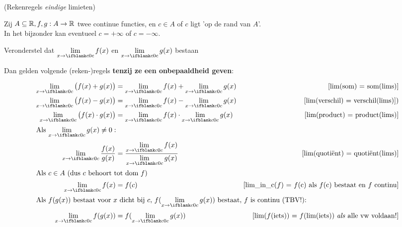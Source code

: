 \documentclass[numbers]{ximera}
\begin{document}
\begin{proposition} (Rekenregels \textit{eindige} limieten)
	
	Zij $A\subseteq\mathbb{R}, f,g:A\to\mathbb{R}$ twee continue functies, en $c\in A$ of $c$ ligt 'op de rand van $A$'. \\
	In het bijzonder kan eventueel $c=+\infty$ of $c=-\infty$. 
	
	Veronderstel dat $\limx[c] f(x)$ en $\limx[c] g(x)$ bestaan%
	
	Dan gelden volgende (reken-)regels  \textbf{\color{red} tenzij ze een {\large onbepaaldheid} geven}: 
	
	
	\begin{align}
		 \limx[c] \big(f(x) +g(x)\big) & = \limx[c] f(x) + \limx[c] g(x)  
		     & \text{[lim(som) = som(lims)]} \label{elim-som} \\
		 \limx[c] \big(f(x) -g(x)\big) & = \limx[c] f(x) - \limx[c] g(x)  
		     & \text{[lim(verschil) = verschil(lims)])} \label{elim-verschil}\\
		 \limx[c] \big(f(x)\cdot g(x)\big) & = \limx[c] f(x) \cdot \limx[c] g(x)  
		     & \text{[lim(product) =  product(lims)]} \label{elim-product} \\
		 \intertext{Als $\limx[c] g(x) \neq 0:$}
		 \limx[c] \dfrac{f(x)}{g(x)} & = \dfrac{\limx[c] f(x)}{\limx[c] g(x)}  
		     & \text{[lim(quotiënt) = quotiënt(lims)]} \label{elim-quotient} \\
		 \intertext{Als $c\in A$ (dus $c$ behoort tot dom $f$)} %
		 \limx[c] f(x) & = f(c) 
		     & \text{[lim\_in\_c($f$) = $f$(c) als $f$(c) bestaat en $f$ continu]} \label{elim-domein} \\
		 \intertext{Als $f(g(x))$ bestaat voor $x$ dicht bij $c$, $f(\limx[c]g(x))$ bestaat, $f$ is continu (TBV!):} 
		 \limx[c] f(g(x)) & = f(\limx[c] g(x)) 
		     & \text{[lim($f$(iets)) =  $f$(lim(iets)) \textit{als} alle vw voldaan!]} \label{elim-continu} 
	\end{align}
\end{proposition}
\end{document}
